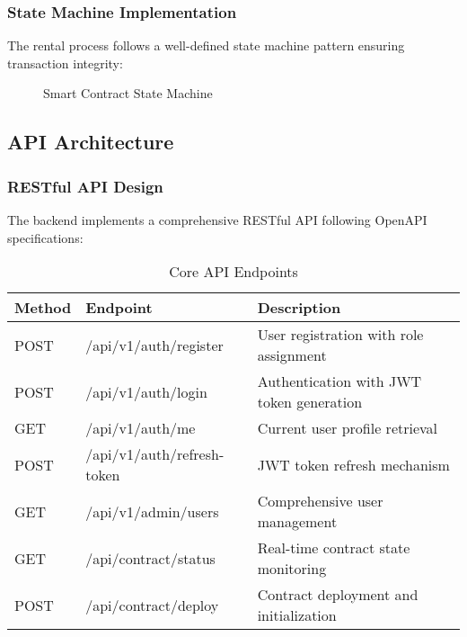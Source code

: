 \documentclass[12pt,a4paper]{article}
\begin{document}
\subsubsection{State Machine Implementation}
The rental process follows a well-defined state machine pattern ensuring transaction integrity:

\begin{figure}[H]
\centering
{}
\caption{Smart Contract State Machine}
\label{fig:statemachine}
\end{figure}

\subsection{API Architecture}

\subsubsection{RESTful API Design}
The backend implements a comprehensive RESTful API following OpenAPI specifications:

\begin{table}[H]
\centering
\begin{tabular}{|l|l|p{6cm}|}
\hline
\textbf{Method} & \textbf{Endpoint} & \textbf{Description} \\
\hline
POST & /api/v1/auth/register & User registration with role assignment \\
POST & /api/v1/auth/login & Authentication with JWT token generation \\
GET & /api/v1/auth/me & Current user profile retrieval \\
POST & /api/v1/auth/refresh-token & JWT token refresh mechanism \\
GET & /api/v1/admin/users & Comprehensive user management \\
GET & /api/contract/status & Real-time contract state monitoring \\
POST & /api/contract/deploy & Contract deployment and initialization \\
\hline
\end{tabular}
\caption{Core API Endpoints}
\end{table}
\end{document}
